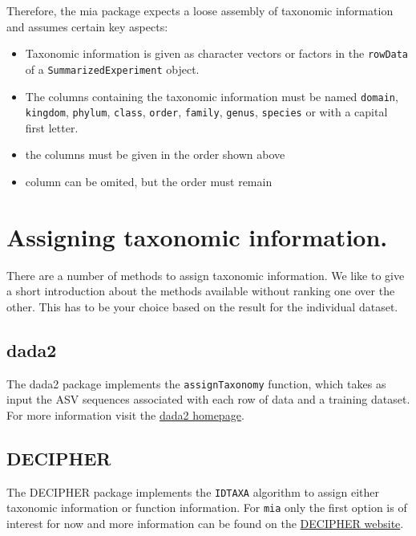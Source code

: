 \documentclass[
]{book}
\providecommand{\tightlist}{%
  \setlength{\itemsep}{0pt}\setlength{\parskip}{0pt}}
\begin{document}
Therefore, the mia package expects a loose assembly of taxonomic information
and assumes certain key aspects:

\begin{itemize}
\tightlist
\item
  Taxonomic information is given as character vectors or factors in the
  \texttt{rowData} of a \texttt{SummarizedExperiment} object.
\item
  The columns containing the taxonomic information must be named \texttt{domain},
  \texttt{kingdom}, \texttt{phylum}, \texttt{class}, \texttt{order}, \texttt{family}, \texttt{genus}, \texttt{species} or with
  a capital first letter.
\item
  the columns must be given in the order shown above
\item
  column can be omited, but the order must remain
\end{itemize}

\hypertarget{assigning-taxonomic-information.}{%
\section{Assigning taxonomic information.}\label{assigning-taxonomic-information.}}

There are a number of methods to assign taxonomic information. We like to give
a short introduction about the methods available without ranking one over the
other. This has to be your choice based on the result for the individual
dataset.

\hypertarget{dada2}{%
\subsection{dada2}\label{dada2}}

The dada2 package \citep{Callahan2016dada2} implements the \texttt{assignTaxonomy}
function, which takes as input the ASV sequences associated with each
row of data and a training dataset. For more information visit the
\href{https://benjjneb.github.io/dada2/assign.html}{dada2 homepage}.

\hypertarget{decipher}{%
\subsection{DECIPHER}\label{decipher}}

The DECIPHER package \citep{R_DECIPHER} implements the \texttt{IDTAXA} algorithm to assign
either taxonomic information or function information. For \texttt{mia}
only the first option is of interest for now and more information can be
found on the \href{http://www2.decipher.codes/Classification.html}{DECIPHER website}.
\end{document}
